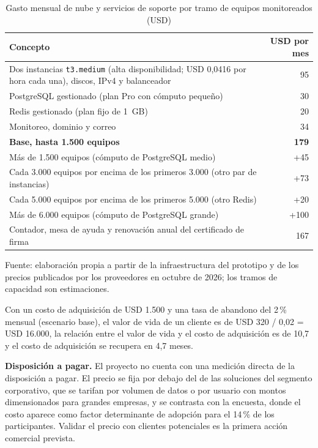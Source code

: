 \begin{table}[h]
\centering
\caption{Gasto mensual de nube y servicios de soporte por tramo de equipos monitoreados (USD)}
\label{tab:costo-nube}
\begin{tabular}{p{8.2cm}r}
\hline
\textbf{Concepto} & \textbf{USD por mes} \\
\hline
Dos instancias \texttt{t3.medium} (alta disponibilidad; USD 0,0416 por hora cada una), discos, IPv4 y balanceador & 95 \\
PostgreSQL gestionado (plan Pro con cómputo pequeño) & 30 \\
Redis gestionado (plan fijo de 1~GB) & 20 \\
Monitoreo, dominio y correo & 34 \\
\textbf{Base, hasta 1.500 equipos} & \textbf{179} \\
Más de 1.500 equipos (cómputo de PostgreSQL medio) & +45 \\
Cada 3.000 equipos por encima de los primeros 3.000 (otro par de instancias) & +73 \\
Cada 5.000 equipos por encima de los primeros 5.000 (otro Redis) & +20 \\
Más de 6.000 equipos (cómputo de PostgreSQL grande) & +100 \\
Contador, mesa de ayuda y renovación anual del certificado de firma & 167 \\
\hline
\end{tabular}\par
{\small Fuente: elaboración propia a partir de la infraestructura del prototipo y de los precios publicados por los proveedores en octubre de 2026; los tramos de capacidad son estimaciones.\par}
\end{table}
\FloatBarrier

Con un costo de adquisición de USD 1.500 y una tasa de abandono del 2\,\% mensual (escenario base),
el valor de vida de un cliente es de USD 320 / 0,02 = USD 16.000, la relación entre el valor de vida
y el costo de adquisición es de 10,7 y el costo de adquisición se recupera en 4,7 meses.

\textbf{Disposición a pagar.} El proyecto no cuenta con una medición directa de la disposición a
pagar. El precio se fija por debajo del de las soluciones del segmento corporativo, que se
tarifan por volumen de datos o por usuario con montos dimensionados para grandes empresas, y se
contrasta con la encuesta, donde el costo aparece como factor determinante de adopción para el
14\,\% de los participantes. Validar el precio con clientes potenciales es la primera acción
comercial prevista.

